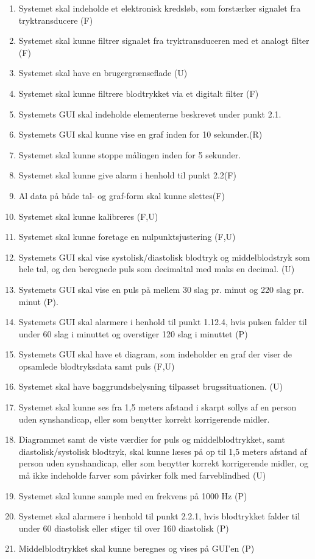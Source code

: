 \begin{enumerate}[4.1]
	\item Systemet skal indeholde et elektronisk kredsløb, som forstærker signalet fra tryktransducere (F)
	\item Systemet skal kunne filtrer signalet fra tryktransduceren med et analogt filter (F)
	\item Systemet skal have en brugergrænseflade (U)
	\item Systemet skal kunne filtrere blodtrykket via et digitalt filter (F)
	\item Systemets GUI skal indeholde elementerne beskrevet under punkt 2.1.  
	\item Systemets GUI skal kunne vise en graf inden for 10 sekunder.(R)
	\item Systemet skal kunne stoppe målingen inden for 5 sekunder.
	\item Systemet skal kunne give alarm i henhold til punkt 2.2(F)
	\item Al data på både tal- og graf-form skal kunne slettes(F)
	\item Systemet skal kunne kalibreres (F,U)
	\item Systemet skal kunne foretage en nulpunktsjustering (F,U)
	\item Systemets GUI skal vise systolisk/diastolisk blodtryk og middelblodstryk som hele tal, og den beregnede puls som decimaltal med maks en decimal. (U)
	\item Systemets GUI skal vise en puls på mellem 30 slag pr. minut og 220 slag pr. minut (P).
	\item Systemets GUI skal alarmere i henhold til punkt 1.12.4, hvis pulsen falder til under 60 slag i minuttet og overstiger 120 slag i minuttet (P)
	\item Systemets GUI skal have et diagram, som indeholder en graf der viser de opsamlede blodtryksdata samt puls (F,U)
	\item Systemet skal have baggrundsbelysning tilpasset brugssituationen. (U)
	\item Systemet skal kunne ses fra 1,5 meters afstand i skarpt sollys af en person uden synshandicap, eller som benytter korrekt korrigerende midler.
	\item Diagrammet samt de viste værdier for puls og middelblodtrykket, samt diastolisk/systolisk blodtryk, skal kunne læses på op til 1,5 meters afstand af person uden synshandicap, eller som benytter korrekt korrigerende midler, og må ikke indeholde farver som påvirker folk med farveblindhed (U)
	\item Systemet skal kunne sample med en frekvens på 1000 Hz (P)
	\item Systemet skal alarmere i henhold til punkt 2.2.1, hvis blodtrykket falder til under 60 diastolisk eller stiger til over 160 diastolisk (P)
	\item Middelblodtrykket skal kunne beregnes og vises på GUI’en (P)


\end{enumerate}
